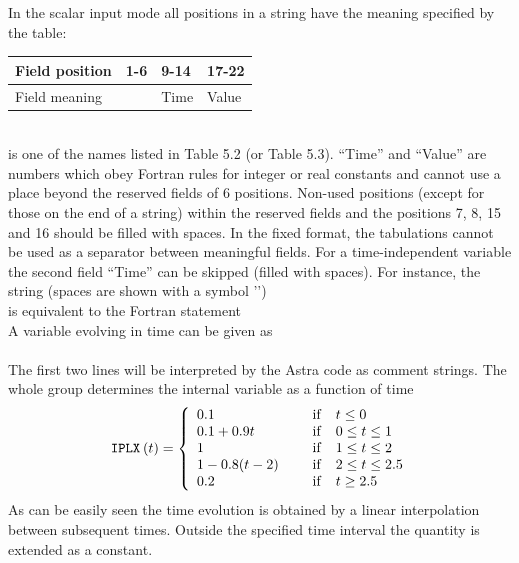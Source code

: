 In the scalar input mode all positions in a string have the meaning
specified by the table: 
\bigskip\\
\begin{tabular}{| l | l l l |}\hline
Field position	&1-6		& 9-14	& 17-22	\\ \hline
Field meaning	&\twd{NAME}	&Time	&Value	\\ \hline
\end{tabular}
\bigskip\\
 is one of the names listed in Table 5.2 (or Table 5.3). 
``Time'' and ``Value'' 
are numbers which obey Fortran rules for integer or real constants and 
cannot use a place beyond the reserved fields of 6 positions. 
Non-used positions (except for those on the end of a string) within 
the reserved fields and the positions 7, 8, 15 and 16 should be filled 
with spaces. 
In the fixed format, the tabulations cannot be used as a separator 
between meaningful fields. 
For a time-independent variable the second field ``Time'' can be 
skipped (filled with spaces).
For instance, the string (spaces are shown with a symbol '{\tt\sp}')
\\ 
is equivalent to the Fortran statement 
\\
A variable evolving in time can be given as
\\
\\
The first two lines will be interpreted by the Astra code as comment
strings.  
The whole group determines the internal variable  as a 
function of time
\begin{equation}\label{IPLX}
\hspace*{2pt}{\tt IPLX}\hspace*{2pt}(t)=\left\{
\begin{array}{ll}
0.1\qquad\qquad\qquad	&{\rm if}\quad t\le 0\\
0.1+0.9t	&{\rm if}\quad 0\le t\le 1\\
1		&{\rm if}\quad 1\le t\le 2\\
1-0.8(t-2)	&{\rm if}\quad 2\le t\le 2.5\\
0.2		&{\rm if}\quad t\geq 2.5\\
\end{array}\right.
\end{equation}
As can be easily seen the time evolution is obtained by a linear
interpolation between subsequent times. 
Outside the specified time interval the quantity is extended as
a constant.

